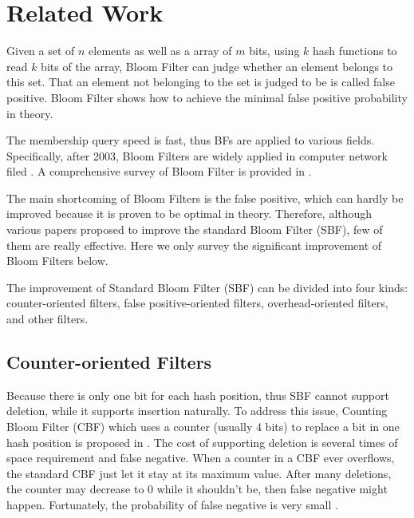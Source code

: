 \section{Related Work}
\label{sec:relatedwork}

Given a set of $n$ elements as well as a array of $m$ bits, using $k$ hash functions to read $k$ bits of the array, Bloom Filter can judge whether an element belongs to this set. That an element not belonging to the set is judged to be is called false positive. Bloom Filter shows  how to achieve the minimal false positive probability in theory. 

The membership query speed is fast, thus BFs are applied to various fields.  Specifically, after 2003, Bloom Filters are widely applied in computer network filed \cite{sig03PBF, songsig05, BFDanLi, yuConext09, BF_TC}. A comprehensive survey of Bloom Filter is provided in \cite{BFSurvey9C}.

The main shortcoming of Bloom Filters is the false positive, which can hardly be improved because it is proven to be optimal in theory. Therefore, although various papers proposed to improve the standard Bloom Filter (SBF), few of them are really effective. Here we only survey the significant improvement of Bloom Filters below. 

The improvement of Standard Bloom Filter (SBF) can be divided into four kinds: counter-oriented filters, false positive-oriented filters, overhead-oriented filters, and other filters.

\subsection{Counter-oriented Filters}
Because there is only one bit for each hash position, thus SBF cannot support deletion, while it supports insertion naturally. 
To address this issue, Counting Bloom Filter (CBF) which uses a counter (usually 4 bits) to replace a bit in one hash position is proposed in \cite{webcaching}. The cost of supporting deletion is several times of space requirement and false negative. When a counter in a CBF ever overflows, the standard CBF just let it stay at its maximum value. After many deletions, the counter may decrease to 0 while it shouldn't be, then false negative might happen. Fortunately, the probability of false negative is very small \cite{falsenegative}.

